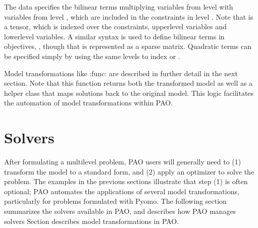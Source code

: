 \documentclass[letterpaper,10pt,english]{sphinxmanual}
\begin{document}
The data  specifies the bilinear terms multiplying
variables from level  with variables from level , which
are included in the constraints in level .  Note that  is a
tensor, which is indexed over the constraints, upper\sphinxhyphen{}level variables
and lower\sphinxhyphen{}level variables.  A similar syntax is used to define bilinear
terms in objectives, , though that is represented as a sparse matrix.
Quadratic terms can be specified simply by using the same levels to index
 or .

Model transformations like :func: are
described in further detail in the next section.  Note that this function
returns both the transformed model as well as a helper class that maps
solutions back to the original model.  This logic facilitates the
automation of model transformations within PAO.


\section{Solvers}
\label{\detokenize{solvers:solvers}}\label{\detokenize{solvers::doc}}
After formulating a multilevel problem, PAO users will generally need to
(1) transform the model to a standard form, and (2) apply an optimizer
to solve the problem.  The examples in the previous sections illustrate
that step (1) is often optional;  PAO automates the applications of
several model transformations, particularly for problems formulated with
Pyomo.  The following section summarizes the solvers available in PAO,
and describes how PAO manages solvers Section 
describes model transformations in PAO.
\end{document}
